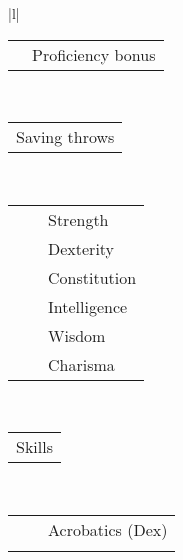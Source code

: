 \newcommand{\dndProfCircle}[1]{ \ifthenelse{\equal{#1}{1}}{\CIRCLE}{\Circle} }
\begin{tabular}{|l|} %
\hline
\begin{tabular}{r l}
\ovalbox{\ifthenelse{\DndProficiencyMod<0}{}{+}\DndProficiencyMod} & {\small Proficiency bonus} \\
\end{tabular} \\
\hline
\hline
\begin{tabular}{c}
{\small Saving throws}
\end{tabular} \\
\begin{tabular}{l r l}
\hline
{\scriptsize \dndProfCircle{\DndIsProficientStr}} &
{\scriptsize \ifthenelse{\DndStrSave<0}{}{+}\DndStrSave} &
{\scriptsize Strength} \\
%
{\scriptsize \dndProfCircle{\DndIsProficientDex}} &
{\scriptsize \ifthenelse{\DndDexSave<0}{}{+}\DndDexSave} &
{\scriptsize Dexterity} \\
%
{\scriptsize \dndProfCircle{\DndIsProficientCon}} &
{\scriptsize \ifthenelse{\DndConSave<0}{}{+}\DndConSave} &
{\scriptsize Constitution} \\
%
{\scriptsize \dndProfCircle{\DndIsProficientInt}} &
{\scriptsize \ifthenelse{\DndIntSave<0}{}{+}\DndIntSave} &
{\scriptsize Intelligence} \\
%
{\scriptsize \dndProfCircle{\DndIsProficientWis}} &
{\scriptsize \ifthenelse{\DndWisSave<0}{}{+}\DndWisSave} &
{\scriptsize Wisdom} \\
%
{\scriptsize \dndProfCircle{\DndIsProficientCha}} &
{\scriptsize \ifthenelse{\DndChaSave<0}{}{+}\DndChaSave} &
{\scriptsize Charisma} \\
\end{tabular} \\
\hline
\hline
\begin{tabular}{c}
{\small Skills}
\end{tabular} \\
\begin{tabular}{l r l}
\hline
{\scriptsize \dndProfCircle{\DndIsProficientAcrobatics}} &
{\scriptsize \ifthenelse{\DndAcrobaticsMod<0}{}{+}\DndAcrobaticsMod} &
{\scriptsize Acrobatics} {\tiny(Dex)} \\
%
{\scriptsize \dndProfCircle{\DndIsProficientAnimalHandling}} &
{\scriptsize \ifthenelse{\DndAnimalHandlingMod<0}{}{+}\DndAnimalHandlingMod} &

\end{tabular}
\end{tabular}
